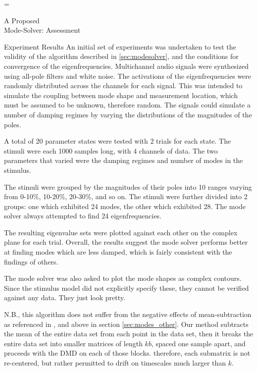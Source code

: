 \documentclass[a4paper,10pt]{report}
\makeatletter
\numberwithin{equation}{section}
\let\realnormalsize=\normalsize
\def\liih@math{\ifmmode$\else\bad@math\fi}
\def\adjustnormalsize{\def\normalsize{\mathsurround=0pt \realnormalsize
 \parindent=0pt\abovedisplayskip=0pt\belowdisplayskip=0pt}%
 \def\phantompar{\csname par\endcsname}\normalsize}%
\newcommand\lthtmlvboxmathA{\adjustnormalsize\setbox\sizebox=\vbox\bgroup %
 \let\ifinner=\iffalse \let\)\liih@math }%
\newcommand\lthtmlmathtype[1]{\gdef\lthtmlmathenv{#1}}%
\newcommand\lthtmlfigureA[1]{\let\@savefreelist\@freelist
       \lthtmlmathtype{#1}\lthtmlvboxmathA}%
\makeatother
\begin{document}
{\newpage\clearpage
\lthtmlfigureA{chapter1643}%
\begin{chapter}
{A Proposed \\Mode-Solver: Assessment}
 \begin{section}{Experiment Results}
An initial set of experiments was undertaken to test the validity of the algorithm described in \ref{sec:modesolver}, and the conditions for convergence of the eigenfrequencies. Multichannel audio signals were synthesized using all-pole filters and white noise. The activations of the eigenfrequencies were randomly distributed across the channels for each signal. This was intended to simulate the coupling between mode shape and measurement location, which must be assumed to be unknown, therefore random. The signals could simulate a number of damping regimes by varying the distributions of the magnitudes of the poles. 
\par
A total of 20 parameter states were tested with 2 trials for each state. The stimuli were each 1000 samples long, with 4 channels of data. The two parameters that varied were the damping regimes and number of modes in the stimulus. 
\par
The stimuli were grouped by the magnitudes of their poles into 10 ranges varying from 0-10\%, 10-20\%, 20-30\%, and so on. The stimuli were further divided into 2 groups: one which exhibited 24 modes, the other which exhibited 28. The mode solver always attempted to find 24 eigenfrequencies.
\par
The resulting eigenvalue sets were plotted against each other on the complex plane for each trial. Overall, the results suggest the mode solver performs better at finding modes which are less damped, which is fairly consistent with the findings of others. \cite{Chen2012} \cite{Feeny1998} \cite{Kerschen2002} \cite{Han2003} 
\par
The mode solver was also asked to plot the mode shapes as complex contours. Since the stimulus model did not explicitly specify these, they cannot be verified against any data. They just look pretty.
\par
N.B., this algorithm does not suffer from the negative effects of mean-subtraction as referenced in \cite{Chen2012}, and above in section \ref{sec:modes_other}. Our method subtracts the mean of the entire data set from each point in the data set, then it breaks the entire data set into smaller matrices of length $kb$, spaced one sample apart, and proceeds with the DMD on each of those blocks. therefore, each submatrix is not re-centered, but rather permitted to drift on timescales much larger than $k$.

\end{section}
\end{chapter}}
\end{document}

